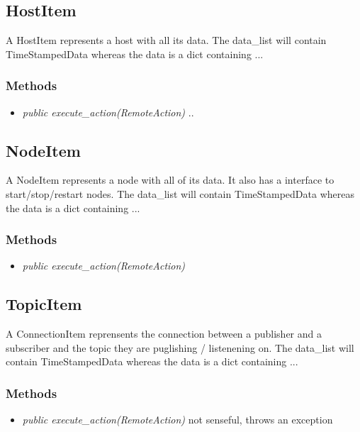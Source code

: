 \subsection{HostItem}
A HostItem represents a host with all its data.
The data\_list will contain TimeStampedData whereas the data is a dict containing ...
\subsubsection{Methods}
\begin{itemize}
  \item \textit{public execute\_action(RemoteAction)}
  ..
\end{itemize}

\subsection{NodeItem}
 A NodeItem represents a node with all of its data. It also has a interface to start/stop/restart nodes.
 The data\_list will contain TimeStampedData whereas the data is a dict containing ...
\subsubsection{Methods}
\begin{itemize}
  \item \textit{public execute\_action(RemoteAction)}
\end{itemize}

\subsection{TopicItem}
A ConnectionItem reprensents the connection between a publisher and a subscriber and the topic they are puglishing / listenening on.
The data\_list will contain TimeStampedData whereas the data is a dict containing ...
\subsubsection{Methods}
\begin{itemize}
  \item \textit{public execute\_action(RemoteAction)} not senseful, throws an exception
\end{itemize}

